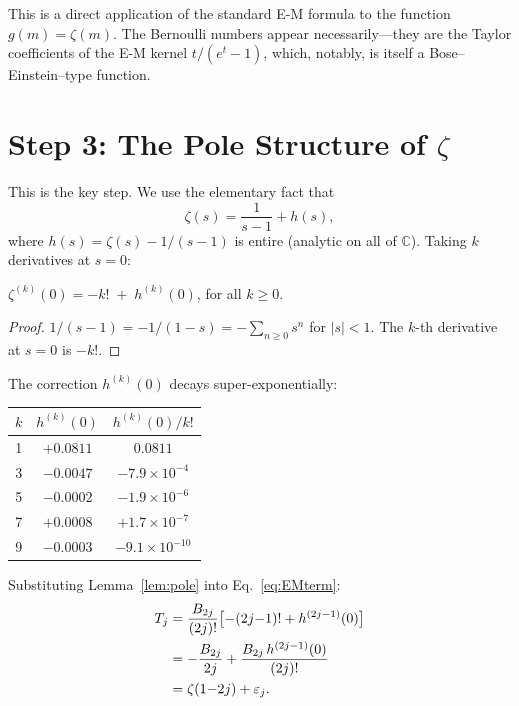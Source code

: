 \documentclass[aps,prl,twocolumn,superscriptaddress,nofootinbib]{revtex4-2}
\begin{document}
\noindent This is a direct application of the standard E-M formula
to the function $g(m)=\zeta(m)$.  The Bernoulli numbers appear
necessarily---they are the Taylor coefficients of the E-M kernel
$t/(e^t-1)$, which, notably, is itself a Bose--Einstein--type
function.

\section{Step 3: The Pole Structure of $\zeta$}

This is the key step.  We use the elementary fact that
\begin{equation}\label{eq:decomp}
  \zeta(s) = \frac{1}{s-1} + h(s),
\end{equation}
where $h(s)=\zeta(s)-1/(s-1)$ is entire (analytic on all of
$\mathbb{C}$).  Taking $k$ derivatives at $s=0$:

\begin{lemma}\label{lem:pole}
$\displaystyle\zeta^{(k)}(0)=-k!\;+\;h^{(k)}(0)$, \quad for all
$k\geq 0$.
\end{lemma}

\begin{proof}
$1/(s-1)=-1/(1-s)=-\sum_{n\geq 0}s^n$ for $|s|<1$.  The $k$-th
derivative at $s=0$ is $-k!$.
\end{proof}

\noindent The correction $h^{(k)}(0)$ decays super-exponentially:

\begin{center}
\begin{tabular}{ccc}
\hline
$k$ & $h^{(k)}(0)$ & $h^{(k)}(0)/k!$ \\
\hline
1 & $+0.0811$ & $0.0811$ \\
3 & $-0.0047$ & $-7.9\times 10^{-4}$ \\
5 & $-0.0002$ & $-1.9\times 10^{-6}$ \\
7 & $+0.0008$ & $+1.7\times 10^{-7}$ \\
9 & $-0.0003$ & $-9.1\times 10^{-10}$ \\
\hline
\end{tabular}
\end{center}

\noindent Substituting Lemma~\ref{lem:pole} into
Eq.~\eqref{eq:EMterm}:
\begin{align}
  T_j &= \frac{B_{2j}}{(2j)!}\bigl[-(2j{-}1)!+h^{(2j-1)}(0)\bigr]\notag\\
  &= -\frac{B_{2j}}{2j}+\frac{B_{2j}\,h^{(2j-1)}(0)}{(2j)!}\notag\\
  &= \zeta(1{-}2j)+\varepsilon_j.\label{eq:Tj}
\end{align}
\end{document}
